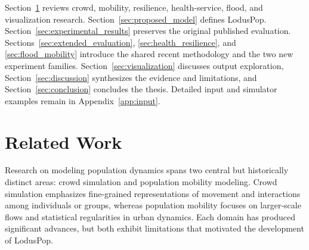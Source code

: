 \documentclass[pdflatex,sn-mathphys-num]{sn-jnl}%
\newcommand\blue[1]{#1}
\theoremstyle{thmstyleone}%
\theoremstyle{thmstyletwo}%
\theoremstyle{thmstylethree}%
\begin{document}
Section~\ref{sec:related_work} reviews crowd, mobility, resilience, health-service, flood, and visualization research. Section~\ref{sec:proposed_model} defines LodusPop. Section~\ref{sec:experimental_results} preserves the original published evaluation. Sections~\ref{sec:extended_evaluation}, \ref{sec:health_resilience}, and \ref{sec:flood_mobility} introduce the shared recent methodology and the two new experiment families. Section~\ref{sec:visualization} discusses output exploration, Section~\ref{sec:discussion} synthesizes the evidence and limitations, and Section~\ref{sec:conclusion} concludes the thesis. Detailed input and simulator examples remain in Appendix~\ref{app:input}.


\section{Related Work}
\label{sec:related_work}

\blue{Research on modeling population dynamics spans two central but historically distinct areas: crowd simulation and population mobility modeling. Crowd simulation emphasizes fine-grained representations of movement and interactions among individuals or groups, whereas population mobility focuses on larger-scale flows and statistical regularities in urban dynamics. Each domain has produced significant advances, but both exhibit limitations that motivated the development of LodusPop.}
\end{document}
